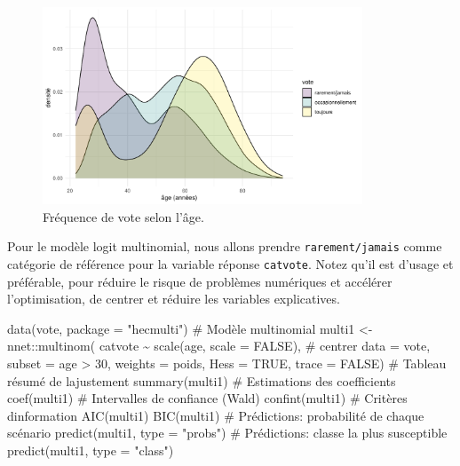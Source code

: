 \documentclass[
  11pt,
  letterpaper,
]{scrbook}
\newenvironment{Shaded}{\begin{snugshade}}{\end{snugshade}}
\newcommand{\AttributeTok}[1]{\textcolor[rgb]{0.40,0.45,0.13}{#1}}
\newcommand{\CommentTok}[1]{\textcolor[rgb]{0.37,0.37,0.37}{#1}}
\newcommand{\ConstantTok}[1]{\textcolor[rgb]{0.56,0.35,0.01}{#1}}
\newcommand{\DecValTok}[1]{\textcolor[rgb]{0.68,0.00,0.00}{#1}}
\newcommand{\FunctionTok}[1]{\textcolor[rgb]{0.28,0.35,0.67}{#1}}
\newcommand{\NormalTok}[1]{\textcolor[rgb]{0.00,0.23,0.31}{#1}}
\newcommand{\OtherTok}[1]{\textcolor[rgb]{0.00,0.23,0.31}{#1}}
\newcommand{\SpecialCharTok}[1]{\textcolor[rgb]{0.37,0.37,0.37}{#1}}
\newcommand{\StringTok}[1]{\textcolor[rgb]{0.13,0.47,0.30}{#1}}
\theoremstyle{definition}
\theoremstyle{remark}
\begin{document}
\begin{figure}[ht!]

{\centering \includegraphics[width=0.85\textwidth,height=\textheight]{reglogistique_files/figure-pdf/fig-vote-age-1.pdf}

}

\caption{\label{fig-vote-age}Fréquence de vote selon l'âge.}

\end{figure}

Pour le modèle logit multinomial, nous allons prendre
\texttt{rarement/jamais} comme catégorie de référence pour la variable
réponse \texttt{catvote}. Notez qu'il est d'usage et préférable, pour
réduire le risque de problèmes numériques et accélérer l'optimisation,
de centrer et réduire les variables explicatives.

\begin{Shaded}
\begin{Highlighting}[]
\FunctionTok{data}\NormalTok{(vote, }\AttributeTok{package =} \StringTok{"hecmulti"}\NormalTok{)}
\CommentTok{\# Modèle multinomial}
\NormalTok{multi1 }\OtherTok{\textless{}{-}}\NormalTok{ nnet}\SpecialCharTok{::}\FunctionTok{multinom}\NormalTok{(}
\NormalTok{  catvote }\SpecialCharTok{\textasciitilde{}} \FunctionTok{scale}\NormalTok{(age, }\AttributeTok{scale =} \ConstantTok{FALSE}\NormalTok{), }\CommentTok{\# centrer}
  \AttributeTok{data =}\NormalTok{ vote, }
  \AttributeTok{subset =}\NormalTok{ age }\SpecialCharTok{\textgreater{}} \DecValTok{30}\NormalTok{,}
  \AttributeTok{weights =}\NormalTok{ poids,}
  \AttributeTok{Hess =} \ConstantTok{TRUE}\NormalTok{,}
  \AttributeTok{trace =} \ConstantTok{FALSE}\NormalTok{) }
\CommentTok{\# Tableau résumé de l\textquotesingle{}ajustement}
\FunctionTok{summary}\NormalTok{(multi1)}
\CommentTok{\# Estimations des coefficients}
\FunctionTok{coef}\NormalTok{(multi1)}
\CommentTok{\# Intervalles de confiance (Wald)}
\FunctionTok{confint}\NormalTok{(multi1)}
\CommentTok{\# Critères d\textquotesingle{}information}
\FunctionTok{AIC}\NormalTok{(multi1)}
\FunctionTok{BIC}\NormalTok{(multi1)}
\CommentTok{\# Prédictions: probabilité de chaque scénario}
\FunctionTok{predict}\NormalTok{(multi1, }\AttributeTok{type =} \StringTok{"probs"}\NormalTok{)}
\CommentTok{\# Prédictions: classe la plus susceptible}
\FunctionTok{predict}\NormalTok{(multi1, }\AttributeTok{type =} \StringTok{"class"}\NormalTok{)}
\end{Highlighting}
\end{Shaded}
\end{document}
